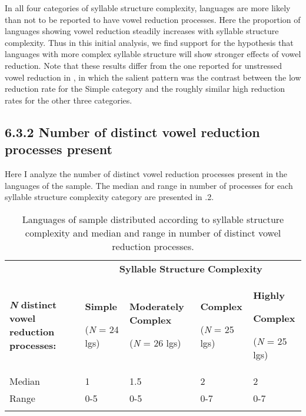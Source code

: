   In all four categories of syllable structure complexity, languages are more likely than not to be reported to have vowel reduction processes. Here the proportion of languages showing vowel reduction steadily increases with syllable structure complexity. Thus in this initial analysis, we find support for the hypothesis that languages with more complex syllable structure will show stronger effects of vowel reduction. Note that these results differ from the one reported for unstressed vowel reduction in , in which the salient pattern was the contrast between the low reduction rate for the Simple category and the roughly similar high reduction rates for the other three categories.


\subsection{6.3.2 Number of distinct vowel reduction processes present}

  Here I analyze the number of distinct vowel reduction processes present in the languages of the sample. The median and range in number of processes for each syllable structure complexity category are presented in .2.






\begin{table}
\begin{tabularx}{\textwidth}{XXXXX}
\lsptoprule
 & \multicolumn{4}{c}{ \textbf{Syllable} \textbf{Structure} \textbf{Complexity}}\\
 \textbf{\textit{N}} \textbf{distinct} \textbf{vowel} \textbf{reduction} \textbf{processes:} & { \textbf{Simple}}

 (\textit{N} = 24 lgs) & { \textbf{Moderately} \textbf{Complex}}

 (\textit{N} = 26 lgs) & { \textbf{Complex}}

 (\textit{N} = 25 lgs) & { \textbf{Highly} }

{ \textbf{Complex}}

 (\textit{N} = 25 lgs)\\
 Median & 1 & 1.5 & 2 & 2\\
 Range & 0-5 & 0-5 & 0-7 & 0-7\\
\lspbottomrule
\end{tabularx}
\caption{\label{6.2}Languages of sample distributed according to syllable structure complexity and median and range in number of distinct vowel reduction processes.}
\end{table}




